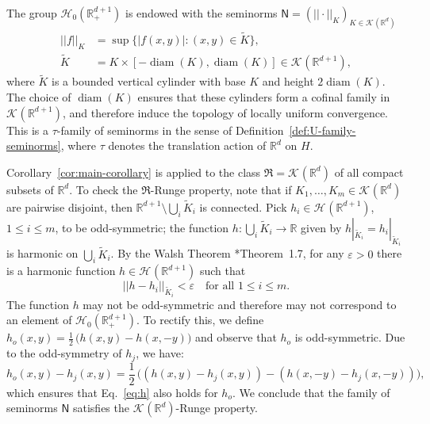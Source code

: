 \documentclass[12pt]{paper}
\numberwithin{equation}{section}
\theoremstyle{plain}
\theoremstyle{definition}
\newcommand{\R}{\mathbb{R}}
\newcommand{\Rd}{\mathbb{R}^{d}}
\newcommand{\mfR}{\mathfrak{R}}
\newcommand{\vietoris}[2][]{\mathcal{K}_{#1}(#2)}
\newcommand{\harm}[2][]{\mathcal{H}_{#1}(#2)}
\newcommand{\unifn}{\mathsf{N}}
\renewcommand{\tilde}{\widetilde}
\DeclareMathOperator*{\diam}{\mathrm{diam}}
\newcommand{\norm}[1]{||#1||}
\renewcommand{\epsilon}{\varepsilon}
\begin{document}
The group \( \mathcal H_0(\R^{d+1}_+)\) is endowed with the seminorms
\(\unifn = (\norm{\cdot}_{K})_{K \in \vietoris{\Rd}}\)
\begin{displaymath}
  \begin{aligned}
    \norm{f}_{K} &= \sup\{|f(x,y)| : (x,y) \in \tilde{K}\},  \\
    \tilde{K}    &= K \times [-\diam(K), \diam(K)] \in \vietoris{\R^{d+1}},
  \end{aligned}
\end{displaymath}
where \(\tilde{K}\) is a bounded vertical cylinder with base \(K\) and height \(2 \diam(K)\).  The
choice of \(\diam(K)\) ensures that these cylinders form a cofinal family in
\(\vietoris{\R^{d+1}}\), and therefore induce the topology of locally uniform convergence.  This is
a \(\tau\)-family of seminorms in the sense of Definition~\ref{def:U-family-seminorms}, where
\(\tau\) denotes the translation action of \(\Rd\) on \(H\).

Corollary~\ref{cor:main-corollary} is applied to the class \(\mfR = \vietoris{\Rd}\) of all compact
subsets of \(\Rd\).  To check the \(\mathfrak R\)-Runge property, note that if
\(K_{1}, \ldots, K_{m} \in \vietoris{\Rd}\) are pairwise disjoint, then
\(\R^{d+1} \setminus \bigcup_{i} \tilde{K}_{i}\) is connected.  Pick \(h_{i} \in \harm{\R^{d+1}}\),
\(1 \le i \le m\), to be odd-symmetric; the function \(h : \bigcup_{i} \tilde{K}_{i} \to \R\) given
by \(h|_{\tilde{K}_{i}} = h_{i}|_{\tilde{K}_{i}}\) is harmonic on \(\bigcup_{i} \tilde{K}_{i}\).  By
the Walsh Theorem \cite{GardinerHarmonicApprox}*{Theorem~1.7}, for any \(\epsilon > 0\) there is a
harmonic function \(h \in \harm{\R^{d+1}}\) such that
\begin{equation}
  \label{eq:h}
  \norm{h - h_{i}}_{\tilde{K}_{i}} < \epsilon \quad \text{for all } 1 \le i \le m.
\end{equation}
The function \(h\) may not be odd-symmetric and therefore may not correspond to an element of
\( \mathcal{H}_0(\R^{d+1}_+)\). To rectify this, we define
\( h_o(x, y) = \frac{1}{2}\, \bigl( h(x, y) - h(x, -y) \bigr) \) and observe that \( h_o \) is
odd-symmetric. Due to the odd-symmetry of \( h_j \), we have:
\begin{displaymath}
  h_o(x, y) - h_j(x, y) = \frac{1}{2}\, \bigl( (h(x, y) - h_j(x, y)) - (h(x, -y) - h_j(x, -y)) \bigr),
\end{displaymath}
which ensures that Eq.~\eqref{eq:h} also holds for \(h_o\). We conclude that the family of seminorms
\(\unifn\) satisfies the \(\vietoris{\Rd}\)-Runge property.
\end{document}
